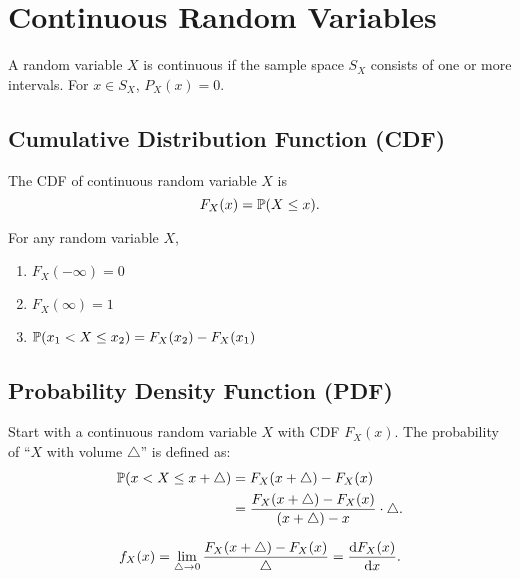 \chapter{Continuous Random Variables}


\begin{axiom}
    A random variable $X$ is continuous if the sample space $S_X$ consists of one or more intervals. For $x\in S_X$, $P_X(x)=0$.
\end{axiom}


\section{Cumulative Distribution Function (CDF)}
\begin{definition}
    The CDF of continuous random variable $X$ is
    \[F_X(x) = \P{X\leq x}.\]
\end{definition}

\begin{theorem}
    For any random variable $X$,
    \begin{enumerate}
        \item $F_X(-\infty)=0$
        \item $F_X(\infty)=1$
        \item $\P{x_1<X\leq x_2} = F_X(x_2)-F_X(x_1)$
    \end{enumerate}
\end{theorem}


\section{Probability Density Function (PDF)}
Start with a continuous random variable $X$ with CDF $F_X(x)$. The probability of ``$X$ with volume $\triangle$'' is defined as:
\begin{align*}
    \P{x<X\leq x+\triangle}
    &= F_X(x+\triangle)-F_X(x) \\
    &= \frac{F_X(x+\triangle)-F_X(x)}{(x+\triangle)-x}\cdot\triangle.
\end{align*}
\begin{definition}
    \begin{align*}
        f_X(x)
        = \lim_{\triangle\rightarrow 0}\frac{F_X(x+\triangle)-F_X(x)}{\triangle}
        = \frac{\mathop{}\!\mathrm{d} F_X(x)}{\mathop{}\!\mathrm{d} x}.
    \end{align*}
\end{definition}

